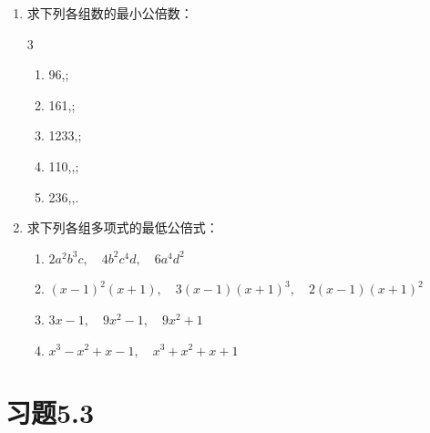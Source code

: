 \begin{ex}
\begin{enumerate}
    \item 求下列各组数的最小公倍数：
    \begin{multicols}{3}
        \begin{enumerate}
        \item 96,;
        \item 161,;
        \item 1233,;
        \item 110,,;
        \item 236,,.
    \end{enumerate}
    \end{multicols}
    
    \item 求下列各组多项式的最低公倍式：
    \begin{enumerate}
        \item $2a^2b^3c,\quad 4b^2c^4d,\quad 6a^4d^2$
        \item $(x-1)^2(x+1),\quad 3(x-1)(x+1)^3,\quad 2 (x-1) (x+1)^2$
        \item $3x-1,\quad 9x^2-1,\quad 9x^2+1$
        \item $x^3-x^2+x-1,\quad x^3+x^2+x+1$
    \end{enumerate}
\end{enumerate}
\end{ex}

\section*{习题5.3}

